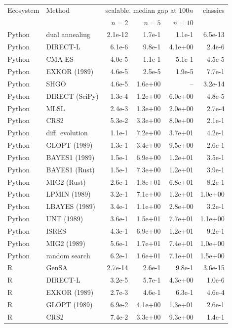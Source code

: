 \begin{tabular}{llrrrr}
\toprule
Ecosystem & Method & \multicolumn{3}{c}{scalable, median gap at $100n$} & classics \\
 & & $n{=}2$ & $n{=}5$ & $n{=}10$ & \\
\midrule
Python & dual annealing & 2.1e-12 & 1.7e-1 & 1.1e-1 & 6.5e-13 \\
Python & DIRECT-L & 6.1e-6 & 9.8e-1 & 4.1e+00 & 2.4e-6 \\
Python & CMA-ES & 4.0e-5 & 1.1e-1 & 5.1e-1 & 4.5e-5 \\
Python & EXKOR (1989) & 4.6e-5 & 2.5e-5 & 1.9e-5 & 7.7e-1 \\
Python & SHGO & 4.6e-5 & 1.6e+00 & -- & 3.2e-14 \\
Python & DIRECT (SciPy) & 1.3e-4 & 1.2e+00 & 6.0e+00 & 4.8e-5 \\
Python & MLSL & 2.4e-3 & 1.3e+00 & 2.0e+00 & 2.7e-4 \\
Python & CRS2 & 5.3e-2 & 3.3e+00 & 8.0e+00 & 2.1e-1 \\
Python & diff. evolution & 1.1e-1 & 7.2e+00 & 3.7e+01 & 4.2e-1 \\
Python & GLOPT (1989) & 1.3e-1 & 3.4e+00 & 9.5e+00 & 2.6e-1 \\
Python & BAYES1 (1989) & 1.5e-1 & 6.9e+00 & 1.2e+01 & 3.5e-1 \\
Python & BAYES1 (Rust) & 1.5e-1 & 7.3e+00 & 1.2e+01 & 3.9e-1 \\
Python & MIG2 (Rust) & 2.6e-1 & 1.8e+01 & 6.8e+01 & 8.2e-1 \\
Python & LPMIN (1989) & 3.2e-1 & 7.1e+00 & 1.2e+01 & 1.0e+00 \\
Python & LBAYES (1989) & 3.4e-1 & 1.1e+00 & 2.8e+00 & 3.2e-1 \\
Python & UNT (1989) & 3.6e-1 & 1.5e+01 & 7.7e+01 & 1.1e+00 \\
Python & ISRES & 4.3e-1 & 6.9e+00 & 1.2e+01 & 9.2e-1 \\
Python & MIG2 (1989) & 5.6e-1 & 1.7e+01 & 7.4e+01 & 1.0e+00 \\
Python & random search & 6.2e-1 & 1.6e+01 & 7.1e+01 & 1.5e+00 \\
\midrule
R & GenSA & 2.7e-14 & 2.6e-1 & 9.8e-1 & 3.6e-15 \\
R & DIRECT-L & 3.2e-5 & 5.7e-1 & 4.3e+00 & 1.0e-6 \\
R & EXKOR (1989) & 2.7e-3 & 4.6e-1 & 6.3e-1 & 4.6e-4 \\
R & GLOPT (1989) & 6.9e-2 & 4.1e+00 & 1.3e+01 & 2.6e-1 \\
R & CRS2 & 7.4e-2 & 3.3e+00 & 9.3e+00 & 1.4e-1 \\

\end{tabular}
